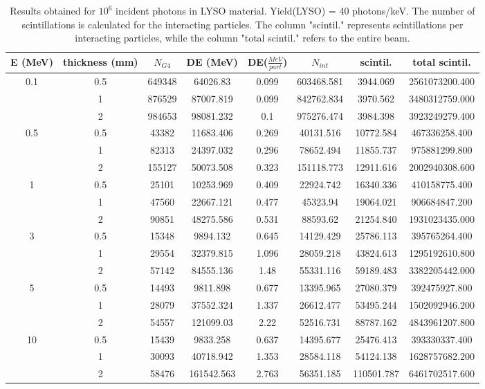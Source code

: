 \documentclass{article}
\begin{document}
\newpage

\begin{table}[H]
    \centering
    \begin{tabular}{|cccccccc|}
    \hline
       E (MeV) & thickness (mm) & $N_{G4}$ &  DE (MeV) &  DE($\frac{MeV}{part}$)  &  $N_{int}$  &  scintil.  &  total scintil. \\ \hline
        \multirow{3}{*}{0.1} & 0.5 & 649348 & 64026.83 & 0.099 & 603468.581 & 3944.069 & 2561073200.400 \\ 
         & 1 & 876529 & 87007.819 & 0.099 & 842762.834 & 3970.562 & 3480312759.000 \\ 
         & 2 & 984653 & 98081.232 & 0.1 & 975276.474 & 3984.398 & 3923249279.400 \\ \hline
        \multirow{3}{*}{0.5} & 0.5 & 43382 & 11683.406 & 0.269 & 40131.516 & 10772.584 & 467336258.400 \\ 
         & 1 & 82313 & 24397.032 & 0.296 & 78652.494 & 11855.737 & 975881299.800 \\ 
         & 2 & 155127 & 50073.508 & 0.323 & 151118.773 & 12911.616 & 2002940308.600 \\ \hline
        \multirow{3}{*}{1} & 0.5 & 25101 & 10253.969 & 0.409 & 22924.742 & 16340.336 & 410158775.400 \\ 
         & 1 & 47560 & 22667.121 & 0.477 & 45323.94 & 19064.021 & 906684847.200 \\ 
         & 2 & 90851 & 48275.586 & 0.531 & 88593.62 & 21254.840 & 1931023435.000 \\ \hline
        \multirow{3}{*}{3} & 0.5 & 15348 & 9894.132 & 0.645 & 14129.429 & 25786.113 & 395765264.400 \\ 
         & 1 & 29554 & 32379.815 & 1.096 & 28059.218 & 43824.613 & 1295192610.800 \\ 
         & 2 & 57142 & 84555.136 & 1.48 & 55331.116 & 59189.483 & 3382205442.000 \\ \hline
        \multirow{3}{*}{5} & 0.5 & 14493 & 9811.898 & 0.677 & 13395.965 & 27080.379 & 392475927.800 \\ 
         & 1 & 28079 & 37552.324 & 1.337 & 26612.477 & 53495.244 & 1502092946.200 \\ 
         & 2 & 54557 & 121099.03 & 2.22 & 52516.731 & 88787.162 & 4843961207.800 \\ \hline
        \multirow{3}{*}{10} & 0.5 & 15439 & 9833.258 & 0.637 & 14395.677 & 25476.413 & 393330337.400 \\ 
         & 1 & 30093 & 40718.942 & 1.353 & 28584.118 & 54124.138 & 1628757682.200 \\ 
         & 2 & 58476 & 161542.563 & 2.763 & 56351.185 & 110501.787 & 6461702517.600 \\ \hline
    \end{tabular}
    \caption{Results obtained for $10^6$ incident photons in LYSO material. Yield(LYSO) = 40 photons/keV. The number of scintillations is calculated for the interacting particles. The column "scintil." represents scintillations per interacting particles, while the column "total scintil." refers to the entire beam. }
\end{table}
\end{document}
